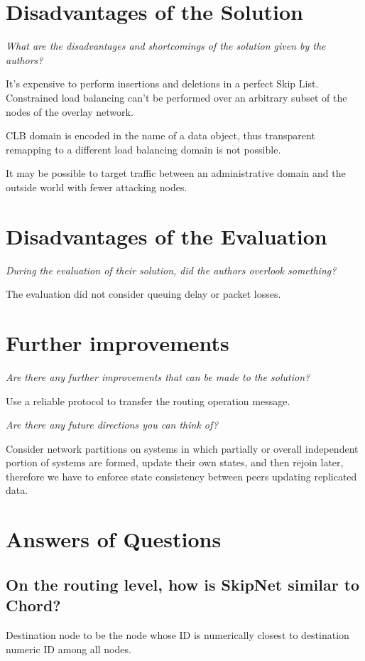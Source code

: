 \documentclass{article}
\begin{document}
 
\section{Disadvantages of the Solution}
{\itshape What are the disadvantages and shortcomings of the solution given by the authors?}

It's expensive to perform insertions and deletions in a perfect Skip List.
Constrained load balancing can't be performed over an arbitrary subset of the nodes of the overlay network.

CLB domain is encoded in the name of a data object, thus transparent remapping to a different load balancing domain is not possible.

It may be possible to target traffic between an administrative domain and the outside world with fewer attacking nodes.


\section{Disadvantages of the Evaluation}
{\itshape During the evaluation of their solution, did the authors overlook something?}

The evaluation did not consider queuing delay or packet losses. 
\section{Further improvements}
{\itshape Are there any further improvements that can be made to the solution?}

Use a reliable protocol to transfer the routing operation message.

{\itshape Are there any future directions you can think of?}

Consider network partitions on systems in which partially or overall independent portion of systems are formed, update their own states, and then rejoin later, therefore we have to enforce state consistency between peers updating replicated data.


\section{Answers of Questions}
\subsection{On the routing level, how is SkipNet similar to Chord?}
Destination node to be the node whose ID is numerically closest to destination numeric ID among all nodes.
\end{document}
